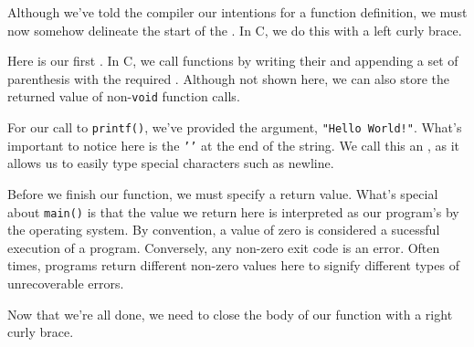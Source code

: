 
\noindent
Although we've told the compiler our intentions for a function
definition, we must now somehow delineate the start of the
.  In C, we do this with a left curly brace.


\noindent
Here is our first .  In C, we call functions by
writing their  and appending a set of parenthesis with
the required .  Although not shown here, we can also
store the returned value of non-\texttt{void} function calls.

For our call to \texttt{printf()}, we've provided the  argument, \texttt{"Hello World!\n"}.  What's
important to notice here is the \texttt{'\n'} at the end of the
string.  We call this an , as it allows us to
easily type special characters such as newline.


\noindent
Before we finish our function, we must specify a return value.  What's
special about \texttt{main()} is that the value we return here is
interpreted as our program's  by the operating system.
By convention, a value of zero is considered a sucessful execution of a
program.  Conversely, any non-zero exit code is an error.  Often times,
programs return different non-zero values here to signify different
types of unrecoverable errors.


\noindent
Now that we're all done, we need to close the body of our function with
a right curly brace.
